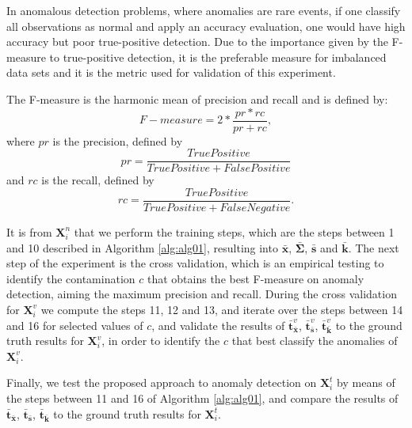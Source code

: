 \documentclass[review]{elsarticle}
\begin{document}
In anomalous detection problems, where anomalies are rare events, if one classify all observations as normal and apply an accuracy evaluation, one would have high accuracy but poor true-positive detection. Due to the importance given by the F-measure to true-positive detection, it is the preferable measure for imbalanced data sets \cite{powers2011evaluation,moustafa2019holistic} and it is the metric used for validation of this experiment.

The F-measure is the harmonic mean of precision and recall and is defined by:
\begin{equation}\label{eq:eq15}
	F-measure = 2 * \frac{pr * rc}{pr + rc},
\end{equation}
where $pr$ is the precision, defined by 
\begin{equation}\label{eq:eq16}
	pr = \frac{True Positive}{True Positive + False Positive}
\end{equation}
and $rc$ is the recall, defined by 
\begin{equation}\label{eq:eq17}
	rc = \frac{True Positive}{True Positive + False Negative}.
\end{equation}

It is from $\boldsymbol{X}_i^n$ that we perform the training steps, which are the steps between 1 and 10 described in Algorithm \ref{alg:alg01}, resulting into $\boldsymbol{\bar{x}}$, $\boldsymbol{\bar{\Sigma}}$, $\boldsymbol{\bar{s}}$ and $\boldsymbol{\bar{k}}$. The next step of the experiment is the cross validation, which is an empirical testing to identify the contamination $c$ that obtains the best F-measure on anomaly detection, aiming the maximum precision and recall. During the cross validation for $\boldsymbol{X}_i^v$ we compute the steps 11, 12 and 13, and iterate over the steps between 14 and 16 for selected values of $c$, and validate the results of $\boldsymbol{\bar{t}}_{\bar{\boldsymbol{x}}}^v$, $\boldsymbol{\bar{t}}_{\bar{\boldsymbol{s}}}^v$, $\boldsymbol{\bar{t}}_{\bar{\boldsymbol{k}}}^v$ to the ground truth results for $\boldsymbol{X}_i^v$, in order to identify the $c$ that best classify the anomalies of $\boldsymbol{X}_i^v$. 

Finally, we test the proposed approach to anomaly detection on $\boldsymbol{X}_i^t$ by means of the steps between 11 and 16 of Algorithm \ref{alg:alg01}, and compare the results of $\boldsymbol{\bar{t}}_{\bar{\boldsymbol{x}}}$, $\boldsymbol{\bar{t}}_{\bar{\boldsymbol{s}}}$, $\boldsymbol{\bar{t}}_{\bar{\boldsymbol{k}}}$ to the ground truth results for $\boldsymbol{X}_i^t$.
\end{document}
